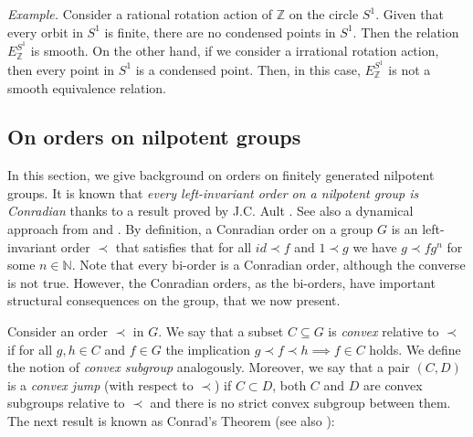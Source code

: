 \documentclass[12pt]{article}
\theoremstyle{definition}
\begin{document}
\noindent\textit{Example.} Consider a rational rotation action of $\mathbb{Z}$ on the circle $S^1$. Given that every orbit in $S^1$ is finite, there are no condensed points in $S^1$. Then the relation $E_{\mathbb{Z}}^{S^1}$ is smooth.
On the other hand, if we consider a irrational rotation action, then every point in $S^1$ is a condensed point. Then, in this case, $E_{\mathbb{Z}}^{S^1}$ is not a smooth equivalence relation.

\subsection{On orders on nilpotent groups}

In this section, 
we give background on orders on finitely generated nilpotent groups.
It is known that \textit{every left-invariant order on a nilpotent group is Conradian} thanks to a result proved by J.C. Ault \cite{Ault}. See also a dynamical approach from \cite{Navas2} and \cite{NaRivas}.
By definition, a Conradian order on a group $G$ is an left-invariant order $\prec$ that satisfies that for all $id\prec f$ and $1\prec g$ we have $g\prec fg^n$ for some $n\in \mathbb{N}$. Note that every bi-order is a Conradian order, although the converse is not true. However, the Conradian orders, as the bi-orders, have important structural consequences on the group, that we now present.

Consider an order $\prec$ in $G$. We say that a subset $C\subseteq G$ is {\it convex} relative to $\prec$ if for all $g,h\in C$ and $f\in G$ the implication $g\prec f\prec h\implies f\in C$ holds. We define the notion of \textit{convex subgroup} analogously. Moreover, we say that a pair $(C,D)$ is a {\it convex jump} (with respect to $\prec$) if $C\subset D$, both $C$ and $D$ are convex subgroups relative to $\prec$ and there is no strict convex subgroup between them. The next result is known as Conrad's Theorem \cite{Conrad} (see also \cite{Botto}):
\end{document}
